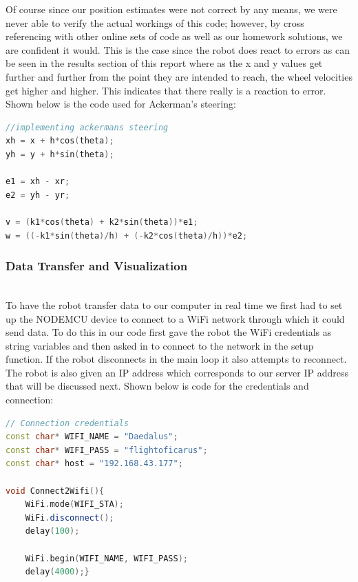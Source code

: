 \documentclass[conference]{IEEEtran}
\begin{document}
    Of course since our position estimates were not correct by any means, we were
    never able to verify the actual workings of this code; however, by cross
    referencing with other online sets of code as well as our homework solutions,
    we are confident it would. This is the case since the robot does react to errors
    as can be seen in the results section of this report where as the x and y values
    get further and further from the point they are intended to reach, the wheel
    velocities get higher and higher. This indicates that there really is a reaction
    to error. Shown below is the code used for Ackerman’s steering:\\

\begin{lstlisting}[language=C++, caption=Ackerman’s Steering Code]
//implementing ackermans steering
xh = x + h*cos(theta);
yh = y + h*sin(theta);

e1 = xh - xr;
e2 = yh - yr;

v = (k1*cos(theta) + k2*sin(theta))*e1;
w = ((-k1*sin(theta)/h) + (-k2*cos(theta)/h))*e2;\end{lstlisting}


    \subsubsection{Data Transfer and Visualization}

    ~~\\To have the robot transfer data to our computer in real time we first had to
    set up the NODEMCU device to connect to a WiFi network through which it could send
    data. To do this in our code first gave the robot the WiFi credentials as string
    variables and then asked in to connect to the network in the setup function. If the
    robot disconnects in the main loop it also attempts to reconnect. The robot is also
    given an IP address which corresponds to our server IP address that will be discussed
    next. Shown below is code for the credentials and connection:

\begin{lstlisting}[language=C++, caption=Robot Connection Code]
// Connection credentials
const char* WIFI_NAME = "Daedalus";
const char* WIFI_PASS = "flightoficarus";
const char* host = "192.168.43.177";

void Connect2Wifi(){
    WiFi.mode(WIFI_STA);
    WiFi.disconnect();
    delay(100);
    
    WiFi.begin(WIFI_NAME, WIFI_PASS);
    delay(4000);}\end{lstlisting}
\end{document}
